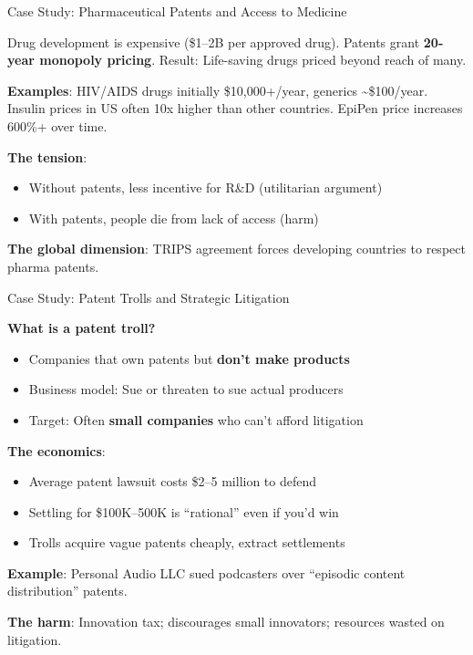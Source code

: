 ﻿\documentclass[aspectratio=169,11pt]{beamer}
\begin{document}
\begin{frame}{Case Study: Pharmaceutical Patents and Access to Medicine}
\begin{casestudybox}
Drug development is expensive (\$1--2B per approved drug). Patents grant \textbf{20-year monopoly pricing}. Result: Life-saving drugs priced beyond reach of many.
\end{casestudybox}

\vspace{0.2cm}
\textbf{Examples}: HIV/AIDS drugs initially \$10,000+/year, generics \textasciitilde\$100/year. Insulin prices in US often 10x higher than other countries. EpiPen price increases 600\%+ over time.

\vspace{0.2cm}
\textbf{The tension}:
\begin{itemize}
    \item Without patents, less incentive for R\&D (utilitarian argument)
    \item With patents, people die from lack of access (harm)
\end{itemize}

\textbf{The global dimension}: TRIPS agreement forces developing countries to respect pharma patents.
\end{frame}

\begin{frame}{Case Study: Patent Trolls and Strategic Litigation}
\begin{casestudybox}
\textbf{What is a patent troll?}
\begin{itemize}
    \item Companies that own patents but \textbf{don't make products}
    \item Business model: Sue or threaten to sue actual producers
    \item Target: Often \textbf{small companies} who can't afford litigation
\end{itemize}
\end{casestudybox}

\vspace{0.2cm}
\textbf{The economics}:
\begin{itemize}
    \item Average patent lawsuit costs \$2--5 million to defend
    \item Settling for \$100K--500K is ``rational'' even if you'd win
    \item Trolls acquire vague patents cheaply, extract settlements
\end{itemize}

\vspace{0.2cm}
\textbf{Example}: Personal Audio LLC sued podcasters over ``episodic content distribution'' patents.

\vspace{0.2cm}
\textbf{The harm}: Innovation tax; discourages small innovators; resources wasted on litigation.
\end{frame}
\end{document}
